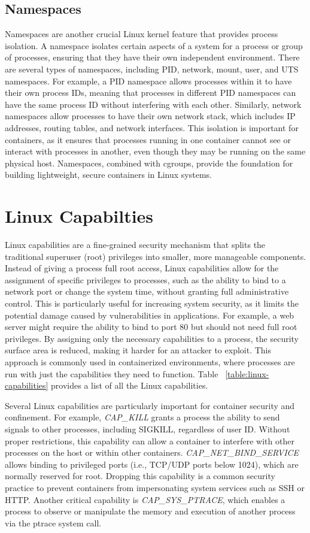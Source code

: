 \documentclass[12pt]{report}
\begin{document}
\begin{doublespace}
\subsection{Namespaces}
Namespaces are another crucial Linux kernel feature that provides process isolation. A namespace isolates certain aspects of a system for a process or group of processes, ensuring that they have their own independent environment. There are several types of namespaces, including PID, network, mount, user, and UTS namespaces. For example, a PID namespace allows processes within it to have their own process IDs, meaning that processes in different PID namespaces can have the same process ID without interfering with each other. Similarly, network namespaces allow processes to have their own network stack, which includes IP addresses, routing tables, and network interfaces. This isolation is important for containers, as it ensures that processes running in one container cannot see or interact with processes in another, even though they may be running on the same physical host. Namespaces, combined with cgroups, provide the foundation for building lightweight, secure containers in Linux systems.


\section{Linux Capabilties}
Linux capabilities are a fine-grained security mechanism that splits the traditional superuser (root) privileges into smaller, more manageable components. Instead of giving a process full root access, Linux capabilities allow for the assignment of specific privileges to processes, such as the ability to bind to a network port or change the system time, without granting full administrative control. This is particularly useful for increasing system security, as it limits the potential damage caused by vulnerabilities in applications. For example, a web server might require the ability to bind to port 80 but should not need full root privileges. By assigning only the necessary capabilities to a process, the security surface area is reduced, making it harder for an attacker to exploit. This approach is commonly used in containerized environments, where processes are run with just the capabilities they need to function. Table ~\ref{table:linux-capabilities} provides a list of all the Linux capabilities.

Several Linux capabilities are particularly important for container security and confinement. For example, \textit{CAP_KILL} grants a process the ability to send signals to other processes, including SIGKILL, regardless of user ID. Without proper restrictions, this capability can allow a container to interfere with other processes on the host or within other containers. \textit{CAP_NET_BIND_SERVICE} allows binding to privileged ports (i.e., TCP/UDP ports below 1024), which are normally reserved for root. Dropping this capability is a common security practice to prevent containers from impersonating system services such as SSH or HTTP. Another critical capability is \textit{CAP_SYS_PTRACE}, which enables a process to observe or manipulate the memory and execution of another process via the ptrace system call.


\end{doublespace}
\end{document}
